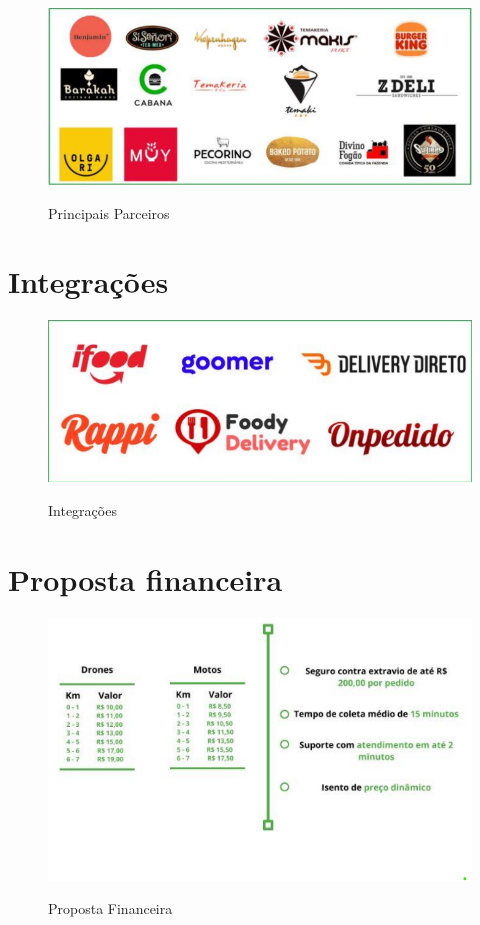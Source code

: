 \begin{figure} [!ht]
   { \centering
    \caption{Principais Parceiros}
    \includegraphics[width=0.9\linewidth]{figuras/principaisparceiros.png}
    \label{fig:enter-label}
    }
 \end{figure}   

 \section{Integrações}

 \begin{figure} [!ht]
   { \centering
    \caption{Integrações}
    \includegraphics[width=0.9\linewidth]{figuras/integracoes.png}
    \label{fig:enter-label}
    }
\end{figure}  

\vspace{3.0cm}

\section{Proposta financeira}

\begin{figure}[!ht]
    {\centering
    \caption{Proposta Financeira}
    \includegraphics[width=0.5\linewidth]{figuras/financeiro.png}
    \label{fig:enter-label}
    }
\end{figure}


